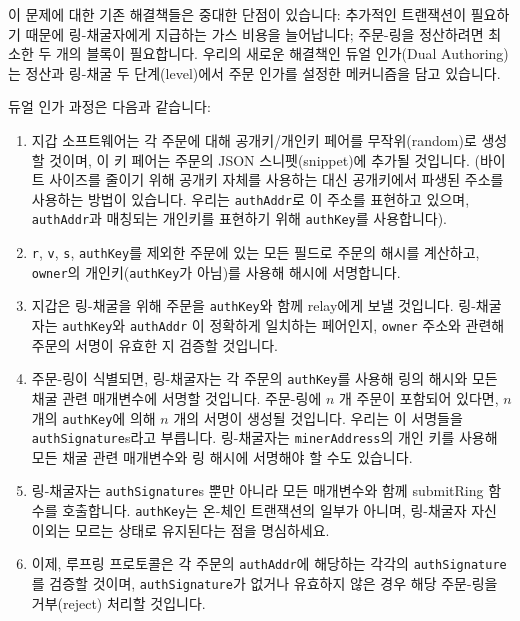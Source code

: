\documentclass[UTF8,nofonts]{article}
\begin{document}
\begin{multicols}{2}
이 문제에 대한 기존 해결책들은 중대한 단점이 있습니다: 추가적인 트랜잭션이 필요하기 때문에 링-채굴자에게 지급하는 가스 비용을 늘어납니다; 주문-링을 정산하려면 최소한 두 개의 블록이 필요합니다. 우리의 새로운 해결책인 듀얼 인가(Dual Authoring)\cite{dualauthor}는 정산과 링-채굴 두 단계(level)에서 주문 인가를 설정한 메커니즘을 담고 있습니다.

듀얼 인가 과정은 다음과 같습니다:

\begin{enumerate}

	\item 지갑 소프트웨어는 각 주문에 대해 공개키/개인키 페어를 무작위(random)로 생성할 것이며, 이 키 페어는 주문의 JSON 스니펫(snippet)에 추가될 것입니다. (바이트 사이즈를 줄이기 위해 공개키 자체를 사용하는 대신 공개키에서 파생된 주소를 사용하는 방법이 있습니다. 우리는 \verb|authAddr|로 이 주소를 표현하고 있으며, \verb|authAddr|과 매칭되는 개인키를 표현하기 위해 \verb|authKey|를 사용합니다).

	\item \verb|r|, \verb|v|, \verb|s|, \verb|authKey|를 제외한 주문에 있는 모든 필드로 주문의 해시를 계산하고, \verb|owner|의 개인키(\verb|authKey|가 아님)를 사용해 해시에 서명합니다.

	\item 지갑은 링-채굴을 위해 주문을 \verb|authKey|와 함께 relay에게 보낼 것입니다. 링-채굴자는 \verb|authKey|와 \verb|authAddr| 이 정확하게 일치하는 페어인지, \verb|owner| 주소와 관련해 주문의 서명이 유효한 지 검증할 것입니다.

	\item 주문-링이 식별되면, 링-채굴자는 각 주문의 \verb|authKey|를 사용해 링의 해시와 모든 채굴 관련 매개변수에 서명할 것입니다. 주문-링에 $n$ 개 주문이 포함되어 있다면, $n$ 개의 \verb|authKey|에 의해 $n$ 개의 서명이 생성될 것입니다. 우리는 이 서명들을 \verb|authSignature|s라고 부릅니다. 링-채굴자는 \verb|minerAddress|의 개인 키를 사용해 모든 채굴 관련 매개변수와 링 해시에 서명해야 할 수도 있습니다.
 
	\item 링-채굴자는 \verb|authSignature|s 뿐만 아니라 모든 매개변수와 함께 submitRing 함수를 호출합니다. \verb|authKey|는 온-체인 트랜잭션의 일부가 아니며, 링-채굴자 자신 이외는 모르는 상태로 유지된다는 점을 명심하세요.

	\item 이제, 루프링 프로토콜은 각 주문의 \verb|authAddr|에 해당하는 각각의 \verb|authSignature|를 검증할 것이며, \verb|authSignature|가 없거나 유효하지 않은 경우 해당 주문-링을 거부(reject) 처리할 것입니다.
 

\end{enumerate}
\end{multicols}
\end{document}
